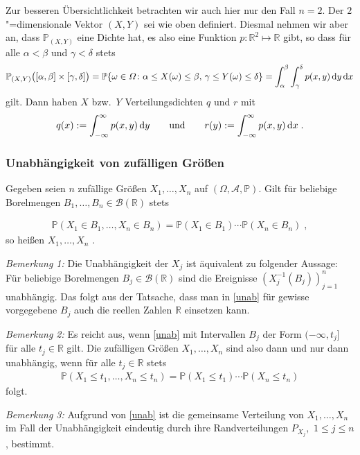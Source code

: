\documentclass[ngerman,draft,parskip=half,twoside]{scrartcl}
\newcommand*{\highl}[2][]{\textbf{\boldmath{#2}}%
  \ifthenelse{\equal{#1}{}}{\index{#2}}{\index{#1}}%
}
\newcommand*{\R}{\mathbb{R}}      %
\newcommand*{\Algeb}{\mathcal{A}}   %
\newcommand*{\BorelM}{\mathcal{B}}  %
\newcommand*{\WKM}{\mathbb{P}}      %
\newcommand*{\diff}[1]{%
  \mathop{\mathrm{\mathstrut d}}%
  \ifx#1(\else%
  \ifx#1[\else%
  \ifx#1\{\else%
    \!%
  \fi\fi\fi#1%
}
\begin{document}
Zur besseren Übersichtlichkeit betrachten wir auch hier nur den Fall $n=2$. Der
$2$"=dimensionale Vektor $(X,Y)$ sei wie oben definiert. Diesmal nehmen wir
aber an, dass $\WKM_{(X,Y)}$ eine Dichte hat, es also eine Funktion $p
\colon\R^2\mapsto\R$ gibt, so dass für alle $\alpha<\beta$ und $\gamma<\delta$
stets
\begin{gather*}
  \WKM_{(X,Y)}\big([\alpha,\beta]\times[\gamma,\delta]\big)
     =\WKM\{\omega\in \Omega \colon
       \alpha\le X(\omega)\le\beta,\,\gamma\le Y(\omega)\le\delta\}
     =\int_\alpha^\beta\int_\gamma^\delta p(x,y)\diff{y} \diff{x}
\end{gather*}
gilt. Dann haben $X$ bzw.~$Y$ Verteilungsdichten $q$ und $r$ mit
\begin{gather*}
  q(x):=\int_{-\infty}^\infty p(x,y)\diff{y}\qquad\mbox{und}\qquad
     r(y):=\int_{-\infty}^\infty p(x,y)\diff{x}\;.
\end{gather*}

\subsubsection{Unabhängigkeit von zufälligen Größen}

Gegeben seien $n$ zufällige Größen $X_1,\dotsc,X_n$ auf $(\Omega,\Algeb,\WKM)$.
Gilt für beliebige Borelmengen $B_1,\dotsc,B_n\in\BorelM(\R)$ stets

\begin{gather}
  \label{unab}
  \WKM(X_1\in B_1,\dotsc,X_n\in B_n)=\WKM(X_1\in B_1)\dotsm\WKM(X_n\in B_n)\;,
\end{gather}
so heißen $X_1,\dotsc,X_n$ \highl{unabhängig}.

\textit{Bemerkung 1:}
Die Unabhängigkeit der $X_j$ ist äquivalent zu folgender Aussage: Für beliebige
Borelmengen $B_j\in\BorelM(\R)$ sind die Ereignisse
$\left(X_j^{-1}(B_j)\right)_{j=1}^n$ unabhängig. Das folgt aus der Tatsache,
dass man in \autoref{unab} für gewisse vorgegebene $B_j$ auch die reellen
Zahlen $\R$ einsetzen kann.

\textit{Bemerkung 2:}
Es reicht aus, wenn \autoref{unab} mit Intervallen $B_j$ der Form
$(-\infty,t_j]$ für alle $t_j\in\R$ gilt. Die zufälligen Größen
$X_1,\dotsc,X_n$ sind also dann und nur dann unabhängig, wenn für alle
$t_j\in\R$ stets
\begin{gather*}
  \WKM(X_1\le t_1,\dotsc,X_n\le t_n)=\WKM(X_1\le t_1)\dotsm\WKM(X_n\le t_n)
\end{gather*}
folgt.

\textit{Bemerkung 3:}
Aufgrund von \autoref{unab} ist die gemeinsame Verteilung von $X_1,\dotsc,X_n$
im Fall der Unabhängigkeit eindeutig durch ihre Randverteilungen $P_{X_j},$
$1\le j\le n$, bestimmt.
\end{document}
